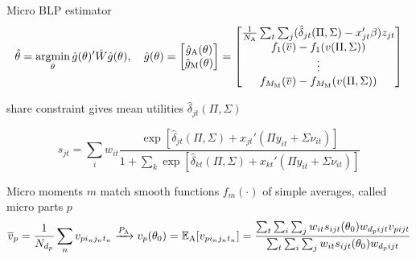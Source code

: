 \begin{frame}[label=estimator]{Micro BLP estimator}
    \vspace{-0.5em}
    \begin{equation*}
        \hat{\theta} = \operatorname*{argmin}_\theta \hat{g}(\theta)'\hat{W}\hat{g}(\theta), \quad \hat{g}(\theta) =
        \begin{bmatrix}
            \hat{g}_\mathrm{A}(\theta) \\
            \hat{g}_\mathrm{M}(\theta)
        \end{bmatrix}
        =
        \begin{bmatrix}
            \frac{1}{N_\mathrm{A}} \sum_t \sum_j (\hat{\delta}_{jt}(\Pi, \Sigma) - x_{jt}'\beta) z_{jt} \\
            f_1(\overline{v}) - f_1(v(\Pi, \Sigma)) \\
            \vdots \\
            f_{M_\mathrm{M}}(\overline{v}) - f_{M_\mathrm{M}}(v(\Pi, \Sigma))
        \end{bmatrix}
    \end{equation*}
    \begin{wideitemize}
        \item {} share constraint gives mean utilities $\hat{\delta}_{jt}(\Pi, \Sigma)$
    \end{wideitemize}
    \begin{equation*}
        s_{jt} = \sum_i w_{it}  \frac{\exp[\hat{\delta}_{jt}(\Pi, \Sigma) + x_{jt}'(\Pi y_{it} + \Sigma \nu_{it})]}{1 + \sum_k \exp[\hat{\delta}_{kt}(\Pi, \Sigma) + x_{kt}'(\Pi y_{it} + \Sigma \nu_{it})]}
    \end{equation*}
    \begin{wideitemize}
        \item Micro moments $m$ match smooth functions $f_m(\cdot)$ of simple averages, called micro parts $p$
        \begin{equation*}
            \overline{v}_p = \frac{1}{N_{d_p}} \sum_n v_{pi_nj_nt_n} \xrightarrow{P_\mathrm{A}} v_p(\theta_0) = \mathbb{E}_\mathrm{A}[v_{pi_nj_nt_n}] = \frac{\sum_t \sum_i \sum_j w_{it} s_{ijt}(\theta_0) w_{d_pijt} v_{pijt}}{\sum_t \sum_i \sum_j w_{it} s_{ijt}(\theta_0) w_{d_pijt}}
        \end{equation*}
    \end{wideitemize}
\end{frame}





